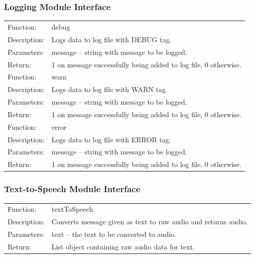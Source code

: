 \documentclass[onecolumn, draftclsnofoot,10pt, compsoc]{IEEEtran}
\begin{document}
	\subsubsection{Logging Module Interface}
	\begin{tabular}[t]{l p{6in}}
		\hline
		Function: & debug \\
		Description: & Logs data to log file with DEBUG tag. \\
		Parameters: & message -- string with message to be logged. \\
		Return: & 1 on message successfully being added to log file, 0 otherwise. \\
		\hline
		Function: & warn \\
		Description: & Logs data to log file with WARN tag. \\
		Parameters: & message -- string with message to be logged. \\
		Return: & 1 on message successfully being added to log file, 0 otherwise. \\
		\hline
		Function: & error \\
		Description: & Logs data to log file with ERROR tag. \\
		Parameters: & message -- string with message to be logged. \\
		Return: & 1 on message successfully being added to log file, 0 otherwise. \\
		\hline
	\end{tabular}

	\subsubsection{Text-to-Speech Module Interface}
	\begin{tabular}[t]{l p{6in}}
		\hline
		Function: & textToSpeech \\
		Description: & Converts message given as text to raw audio and returns audio. \\
		Parameters: & text -- the text to be converted to audio. \\
		Return: & List object containing raw audio data for text. \\
		\hline
	\end{tabular}
\end{document}

